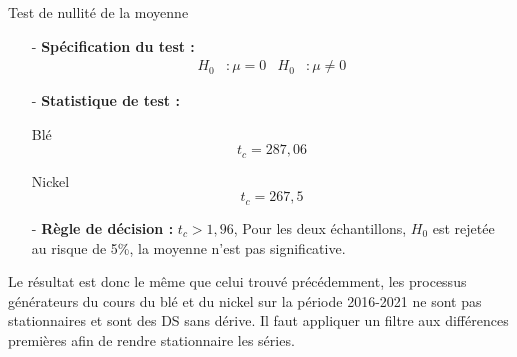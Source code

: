     Test de nullité de la moyenne
    \begin{itemize}
        \item[-]\textbf{Spécification du test :}
    \begin{align*}
        H_{0} &: \mu = 0 & H_{0} &: \mu \neq 0
    \end{align*}
    \item[-]\textbf{Statistique de test :}
    \begin{multicols}{2}
        \centering Blé
        \begin{equation*}
                t_{c} = 287,06
        \end{equation*}
    
        \columnbreak
    
        \centering Nickel
        \begin{equation*}
            t_{c} = 267,5
        \end{equation*}
        \end{multicols}
    \item[-]\textbf{Règle de décision :} $t_{c} > 1,96$, Pour les deux échantillons, $H_{0}$ est rejetée au risque de 5\%, la moyenne n'est pas significative.
    \end{itemize}
Le résultat est donc le même que celui trouvé précédemment, les processus générateurs du cours du blé et du nickel sur la période 2016-2021 ne sont pas stationnaires et 
sont des DS sans dérive. Il faut appliquer un filtre aux différences premières afin de rendre stationnaire les séries.
